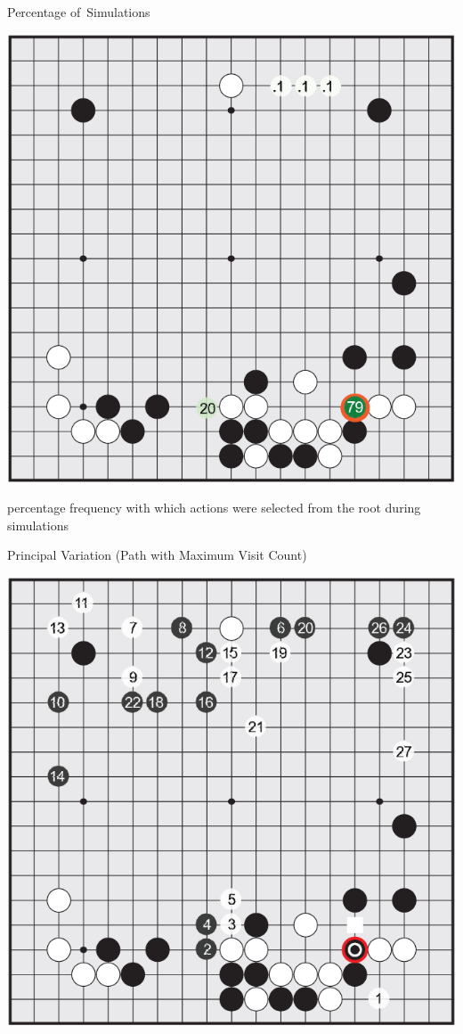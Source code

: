 \documentclass{beamer}
\begin{document}
{    \begin{frame}{Percentage of~Simulations}
      \begin{center}
        \includegraphics[height=.8\textheight]{../img/percentage_of_simulations.png}

        \tiny
        percentage frequency with which actions were selected from the root during simulations
      \end{center}
    \end{frame}

    \begin{frame}{Principal Variation (Path with Maximum Visit Count)}
      \begin{center}
        \includegraphics[height=.65\textheight]{../img/principal_variation.png}


\end{center}
\end{frame}}
\end{document}
